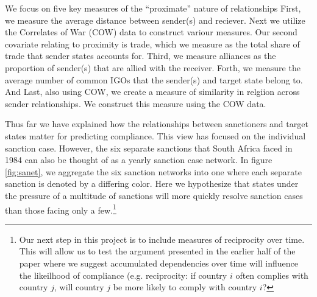 We focus on five key measures of the ``proximate'' nature of relationships First, we measure the average distance between sender(s) and reciever. Next we utilize the Correlates of War (COW) data to construct variour measures. Our second covariate relating to proximity is trade, which we measure as the total share of trade that sender states accounts for. Third, we measure alliances as the proportion of sender(s) that are allied with the receiver. Forth, we measure the average number of common IGOs that the sender(s) and target state belong to. And Last, also using COW, we create a measure of similarity in relgiion across sender relationships.
 We construct this measure using the COW data. 


  
Thus far we have explained how the relationships between sanctioners and target states matter for predicting compliance. This view has focused on the individual sanction case. However, the six separate sanctions that South Africa faced in 1984 can also be thought of as a yearly sanction case network. In figure \ref{fig:sanet}, we aggregate the six sanction networks into one where each separate sanction is denoted by a differing color. Here we hypothesize that states under the pressure of a multitude of sanctions will more quickly resolve sanction cases than those facing only a few.\footnote{Our next step in this project is to include measures of reciprocity over time. This will allow us to test the argument presented in the earlier half of the paper where we suggest accumulated dependencies over time will influence the likeilhood of compliance (e.g. reciprocity: if country $i$ often complies with country $j$, will country $j$ be more likely to comply with country $i$?}


